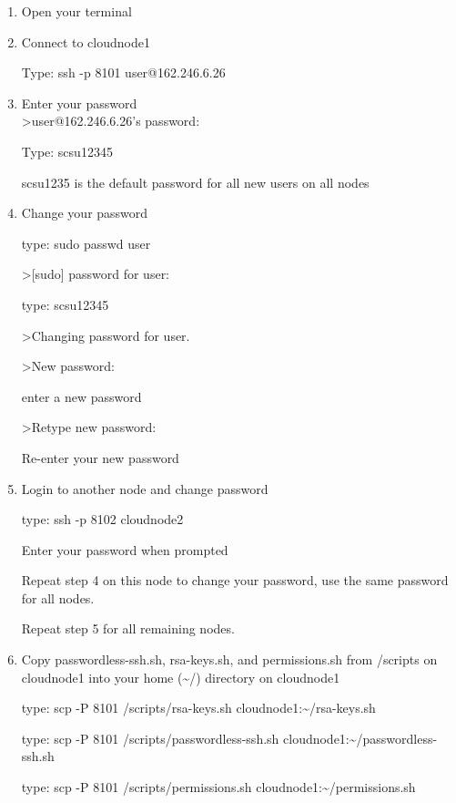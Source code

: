 \begin{enumerate}
\item Open your terminal\\

\item Connect to cloudnode1

Type:  ssh -p 8101 user@162.246.6.26\\


\item Enter your password\\
\textgreater user@162.246.6.26's password:

Type:  scsu12345

scsu1235 is the default password for all new users on all nodes\\


\item Change your password

type:  sudo passwd user

\textgreater[sudo] password for user:

type: scsu12345

\textgreater Changing password for user.

\textgreater New password:

enter a new password

\textgreater Retype new password:

Re-enter your new password\\


\item Login to another node and change password

type:  ssh -p 8102 cloudnode2

Enter your password when prompted

Repeat step 4 on this node to change your password, use the same password for all nodes.

Repeat step 5 for all remaining nodes.\\


\item Copy passwordless-ssh.sh, rsa-keys.sh, and permissions.sh from /scripts on cloudnode1 into your home (\textasciitilde{}/) directory on cloudnode1

type:  scp -P 8101 /scripts/rsa-keys.sh cloudnode1:\textasciitilde{}/rsa-keys.sh

type:  scp -P 8101 /scripts/passwordless-ssh.sh cloudnode1:\textasciitilde{}/passwordless-ssh.sh

type:  scp -P 8101 /scripts/permissions.sh cloudnode1:\textasciitilde{}/permissions.sh\\



\end{enumerate}
